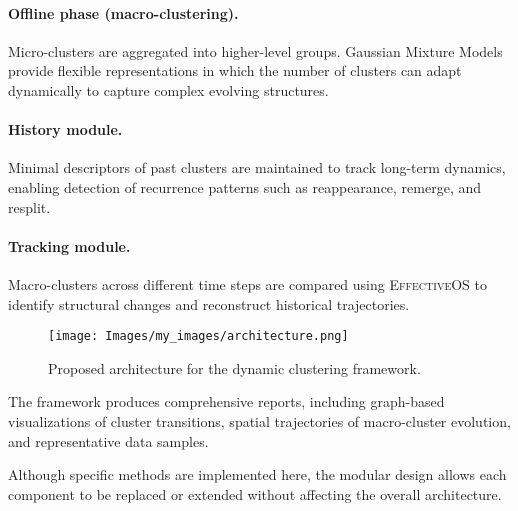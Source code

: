 \paragraph{Offline phase (macro-clustering).}
Micro-clusters are aggregated into higher-level groups. Gaussian Mixture Models
provide flexible representations in which the number of clusters can adapt
dynamically to capture complex evolving structures.

\paragraph{History module.}
Minimal descriptors of past clusters are maintained to track long-term
dynamics, enabling detection of recurrence patterns such as reappearance,
remerge, and resplit.

\paragraph{Tracking module.}
Macro-clusters across different time steps are compared using \textsc{EffectiveOS} to
identify structural changes and reconstruct historical trajectories.

\begin{figure}[H]
    \centering
    \texttt{[image: Images/my\_images/architecture.png]}
    \caption{Proposed architecture for the dynamic clustering framework.}
\end{figure}

The framework produces comprehensive reports, including graph-based
visualizations of cluster transitions, spatial trajectories of macro-cluster
evolution, and representative data samples.

Although specific methods are implemented here, the modular design allows each
component to be replaced or extended without affecting the overall
architecture.